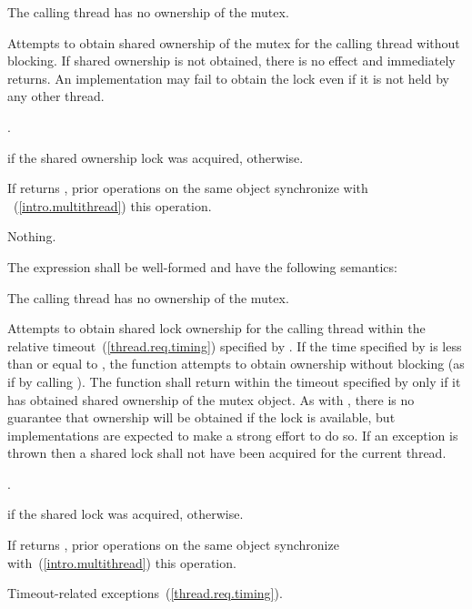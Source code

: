 \begin{itemdescr}
\pnum
\requires The calling thread has no ownership of the mutex.

\pnum
\effects Attempts to obtain shared ownership of the mutex for the calling
thread without blocking. If shared ownership is not obtained, there is no
effect and  immediately returns. An implementation
may fail to obtain the lock even if it is not held by any other thread.

\pnum
\returntype {}.

\pnum
\returns {} if the shared ownership lock was acquired, 
otherwise.

\pnum
\sync If  returns , prior 
operations on the same object synchronize with ~(\ref{intro.multithread}) this
operation.

\pnum
\throws Nothing.
\end{itemdescr}

\pnum
The expression  shall be well-formed and
have the following semantics:

\begin{itemdescr}
\pnum
\requires The calling thread has no ownership of the mutex.

\pnum
\effects Attempts to obtain
shared lock ownership for the calling thread within the relative
timeout~(\ref{thread.req.timing}) specified by . If the time
specified by  is less than or equal to ,
the function attempts to obtain ownership without blocking (as if by calling
). The function shall return within the timeout
specified by  only if it has obtained shared ownership of the
mutex object. \enternote As with , there is no guarantee that
ownership will be obtained if the lock is available, but implementations are
expected to make a strong effort to do so. \exitnote
If an exception is thrown then a shared lock shall not have been acquired for
the current thread.

\pnum
\returntype {}.

\pnum
\returns {} if the shared lock was acquired,  otherwise.

\pnum
\sync If  returns , prior
 operations on the same object synchronize
with~(\ref{intro.multithread}) this operation.

\pnum
\throws Timeout-related exceptions~(\ref{thread.req.timing}).
\end{itemdescr}

